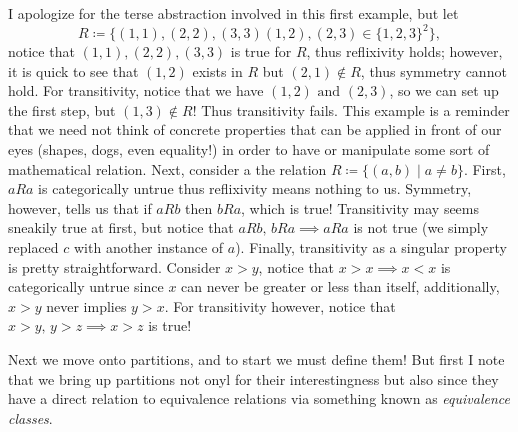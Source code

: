 \documentclass{report}
\begin{document}

\sol I apologize for the terse abstraction involved in this first example, but let \[ R\coloneqq \{(1,1),(2,2),(3,3)(1,2),(2,3)\in \{1,2,3\}^2  \}   ,\] notice that \( (1,1),(2,2),(3,3) \) is true for \( R \), thus reflixivity holds; however, it is quick to see that \( (1,2) \) exists in \( R \) but \( (2,1)\not\in R \), thus symmetry cannot hold. For transitivity, notice that we have \( (1,2) \text{ and }  (2,3)\), so we can set up the first step, but \( (1,3)\not\in  R \)! Thus transitivity fails. This example is a reminder that we need not think of concrete properties that can be applied in front of our eyes (shapes, dogs, even equality!) in order to have or manipulate some sort of mathematical relation. Next, consider a the relation \( R\coloneqq \{(a,b)\mid a \neq  b\}   \). First, \( aRa \) is categorically untrue thus reflixivity means nothing to us. Symmetry, however, tells us that if \( aRb \) then \( bRa \), which is true! Transitivity may seems sneakily true at first, but notice that \( aRb, \, bRa \implies aRa \) is not true (we simply replaced \( c \) with another instance of \( a \)). Finally, transitivity as a singular property is pretty straightforward. Consider \( x>y \), notice that \( x>x \implies x<x \) is categorically untrue since \( x \) can never be greater or less than itself, additionally, \( x>y \) never implies \( y>x \). For transitivity however, notice that \(x>y, \, y>z \implies x>z \) is true!


Next we move onto partitions, and to start we must define them! But first I note that we bring up partitions not onyl for their interestingness but also since they have a direct relation to equivalence relations via something known as \textit{equivalence classes}. 
\end{document}
